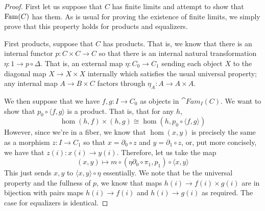\begin{proof}
  First let us suppose that $C$ has finite limits and attempt to show
  that $\operatorname{Fam}(C)$ has them. As is usual for proving the existence of
  finite limits, we simply prove that this property holds for products
  and equalizers.

  First products, suppose that $C$ has products. That is, we know that
  there is an internal functor $p : C \times C \to C$ so that there is
  an internal natural transformation $\eta : 1 \to p \circ \Delta$.
  That is, an external map $\eta : C_0 \to C_1$ sending each object
  $X$ to the diagonal map $X \to X \times X$ internally which
  satisfies the usual universal property; any internal map
  $A \to B \times C$ factors through $\eta_A : A \to A \times A$.

  We then suppose that we have $f, g : I \to C_0$ as objects in
  $\cat{Fam}_I(C)$. We want to show that
  $p_0 \circ \langle f, g \rangle$ is a product. That is, that for any
  $h$,
  \[
    \hom(h, f) \times (h, g) \cong \hom(h, p_0 \circ \langle f, g \rangle)
  \]
  However, since we're in a fiber, we know that $\hom(x, y)$ is
  precisely the same as a morphism $z : I \to C_1$ so that
  $x = \partial_0 \circ z$ and $y = \partial_1 \circ z$, or, put more
  concisely, we have that $z(i) : x(i) \to y(i)$. Therefore, let us
  take the map
  \[
    (x, y) \mapsto m \circ (\eta \partial_0 \circ \pi_1, p_1) \circ \langle x, y \rangle
  \]
  This just sends $x, y$ to $\langle x, y \rangle \circ \eta$
  essentially. We note that be the universal property and the fullness
  of $p$, we know that maps $h(i) \to f(i) \times g(i)$ are in
  bijection with pairs maps $h(i) \to f(i)$ and $h(i) \to g(i)$ as
  required. The case for equalizers is identical.


\end{proof}
